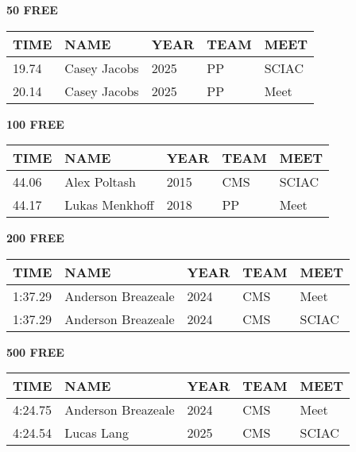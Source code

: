 \begin{table}[H]
\centering
\begin{minipage}[t]{0.48\textwidth}
\centering
\textbf{50 FREE}\\[0.1cm]
\begin{tabular}{@{}p{1.8cm}p{2.8cm}p{1.2cm}p{1.4cm}p{1.4cm}@{}}
\hline
    \textbf{TIME} & \textbf{NAME} & \textbf{YEAR} & \textbf{TEAM} & \textbf{MEET} \\
\hline
    19.74 & Casey Jacobs & 2025 & PP & SCIAC \\
    20.14 & Casey Jacobs & 2025 & PP & Meet \\
\hline
\end{tabular}
\end{minipage}\hfill
\begin{minipage}[t]{0.48\textwidth}
\centering
\textbf{100 FREE}\\[0.1cm]
\begin{tabular}{@{}p{1.8cm}p{2.8cm}p{1.2cm}p{1.4cm}p{1.4cm}@{}}
\hline
    \textbf{TIME} & \textbf{NAME} & \textbf{YEAR} & \textbf{TEAM} & \textbf{MEET} \\
\hline
    44.06 & Alex Poltash & 2015 & CMS & SCIAC \\
    44.17 & Lukas Menkhoff & 2018 & PP & Meet \\
\hline
\end{tabular}
\end{minipage}
\end{table}

\begin{table}[H]
\centering
\begin{minipage}[t]{0.48\textwidth}
\centering
\textbf{200 FREE}\\[0.1cm]
\begin{tabular}{@{}p{1.8cm}p{2.8cm}p{1.2cm}p{1.4cm}p{1.4cm}@{}}
\hline
    \textbf{TIME} & \textbf{NAME} & \textbf{YEAR} & \textbf{TEAM} & \textbf{MEET} \\
\hline
    1:37.29 & Anderson Breazeale & 2024 & CMS & Meet \\
    1:37.29 & Anderson Breazeale & 2024 & CMS & SCIAC \\
\hline
\end{tabular}
\end{minipage}\hfill
\begin{minipage}[t]{0.48\textwidth}
\centering
\textbf{500 FREE}\\[0.1cm]
\begin{tabular}{@{}p{1.8cm}p{2.8cm}p{1.2cm}p{1.4cm}p{1.4cm}@{}}
\hline
    \textbf{TIME} & \textbf{NAME} & \textbf{YEAR} & \textbf{TEAM} & \textbf{MEET} \\
\hline
    4:24.75 & Anderson Breazeale & 2024 & CMS & Meet \\
    4:24.54 & Lucas Lang & 2025 & CMS & SCIAC \\
\hline
\end{tabular}
\end{minipage}
\end{table}

